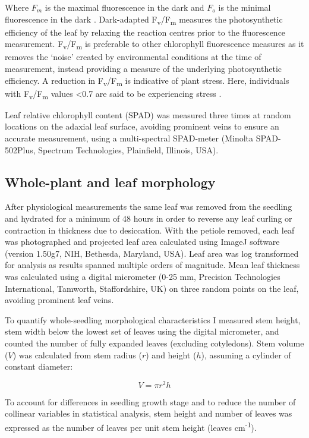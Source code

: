 \documentclass[a4paper,10pt,]{report}
\begin{document}
Where $F_m$ is the maximal fluorescence in the dark and $F_o$ is the minimal fluorescence in the dark \citep{Maxwell2000}. Dark-adapted F\textsubscript{v}/F\textsubscript{m} measures the photosynthetic efficiency of the leaf by relaxing the reaction centres prior to the fluorescence measurement. F\textsubscript{v}/F\textsubscript{m} is preferable to other chlorophyll fluorescence measures as it removes the `noise' created by environmental conditions at the time of measurement, instead providing a measure of the underlying photosynthetic efficiency. A reduction in F\textsubscript{v}/F\textsubscript{m} is indicative of plant stress. Here, individuals with F\textsubscript{v}/F\textsubscript{m} values <0.7 are said to be experiencing stress \citep{Maxwell2000}.


Leaf relative chlorophyll content (SPAD) was measured three times at random locations on the adaxial leaf surface, avoiding prominent veins to ensure an accurate measurement, using a multi-spectral SPAD-meter (Minolta SPAD-502Plus, Spectrum Technologies, Plainfield, Illinois, USA). 

\subsection*{Whole-plant and leaf morphology}
After physiological measurements the same leaf was removed from the seedling and hydrated for a minimum of 48 hours in order to reverse any leaf curling or contraction in thickness due to desiccation. With the petiole removed, each leaf was photographed and projected leaf area calculated using ImageJ software (version 1.50g7, NIH, Bethesda, Maryland, USA). Leaf area was log transformed for analysis as results spanned multiple orders of magnitude. Mean leaf thickness was calculated using a digital micrometer (0-25 mm, Precision Technologies International, Tamworth, Staffordshire, UK) on three random points on the leaf, avoiding prominent leaf veins.

To quantify whole-seedling morphological characteristics I measured stem height, stem width below the lowest set of leaves using the digital micrometer, and counted the number of fully expanded leaves (excluding cotyledons). Stem volume ($V$) was calculated from stem radius ($r$) and height ($h$), assuming a cylinder of constant diameter:

\begin{equation}
V = \pi r^2 h
\end{equation}

To account for differences in seedling growth stage and to reduce the number of collinear variables in statistical analysis, stem height and number of leaves was expressed as the number of leaves per unit stem height (leaves cm\textsuperscript{-1}).
\end{document}
